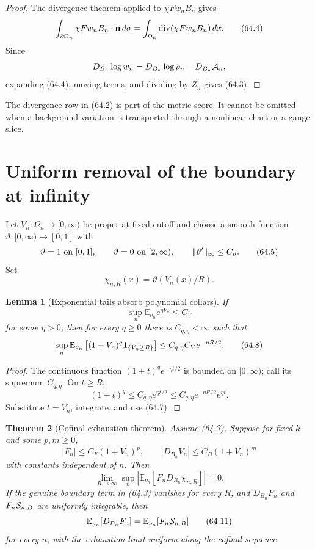 \documentclass[11pt]{article}
\newtheorem{theorem}{Theorem}[section]
\newtheorem{lemma}[theorem]{Lemma}
\theoremstyle{remark}
\begin{document}
\begin{proof}
The divergence theorem applied to
\(\chi Fw_nB_n\) gives
\[
 \int_{\partial\Omega_n}\chi Fw_nB_n\mathbin{\cdot}{\bf n}\,d\sigma
 =
 \int_{\Omega_n}\operatorname{div}(\chi Fw_nB_n)\,dx.  \tag{64.4}
\]
Since
\[
 D_{B_n}\log w_n
 =
 D_{B_n}\log\rho_n-D_{B_n}{\cal A}_n,
\]
expanding (64.4), moving terms, and dividing by \(Z_n\)
gives (64.3).
\end{proof}

The divergence row in (64.2) is part of the metric score.  It
cannot be omitted when a background variation is transported
through a nonlinear chart or a gauge slice.

\section{Uniform removal of the boundary at infinity}

Let \(V_n:\Omega_n\to[0,\infty)\) be proper at fixed cutoff and
choose a smooth function \(\vartheta:[0,\infty)\to[0,1]\) with
\[
 \vartheta=1\ \hbox{on }[0,1],\qquad
 \vartheta=0\ \hbox{on }[2,\infty),\qquad
 \|\vartheta'\|_\infty\leq C_\vartheta.                \tag{64.5}
\]
Set
\[
 \chi_{n,R}(x)=\vartheta(V_n(x)/R).                    \tag{64.6}
\]

\begin{lemma}[Exponential tails absorb polynomial collars]
\label{lem:v15v64-tail}
If
\[
 \sup_n\mathbb E_{\nu_n}e^{\eta V_n}\leq C_V           \tag{64.7}
\]
for some \(\eta>0\), then for every \(q\geq0\) there is
\(C_{q,\eta}<\infty\) such that
\[
 \sup_n\mathbb E_{\nu_n}
 \left[(1+V_n)^q{\bf1}_{\{V_n\geq R\}}\right]
 \leq C_{q,\eta}C_Ve^{-\eta R/2}.                     \tag{64.8}
\]
\end{lemma}

\begin{proof}
The continuous function
\((1+t)^qe^{-\eta t/2}\) is bounded on \([0,\infty)\);
call its supremum \(C_{q,\eta}\).  On \(t\geq R\),
\[
 (1+t)^q
 \leq C_{q,\eta}e^{\eta t/2}
 \leq C_{q,\eta}e^{-\eta R/2}e^{\eta t}.
\]
Substitute \(t=V_n\), integrate, and use (64.7).
\end{proof}

\begin{theorem}[Cofinal exhaustion theorem]
\label{thm:v15v64-exhaustion}
Assume (64.7).  Suppose for fixed \(k\) and some \(p,m\geq0\),
\[
 |F_n|\leq C_F(1+V_n)^p,\qquad
 |D_{B_n}V_n|\leq C_B(1+V_n)^m                       \tag{64.9}
\]
with constants independent of \(n\).  Then
\[
 \lim_{R\to\infty}\sup_n
 \left|\mathbb E_{\nu_n}
 [F_nD_{B_n}\chi_{n,R}]\right|=0.                     \tag{64.10}
\]
If the genuine boundary term in (64.3) vanishes for every \(R\),
and \(D_{B_n}F_n\) and \(F_n{\cal S}_{n,B}\) are uniformly
integrable, then
\[
 \mathbb E_{\nu_n}[D_{B_n}F_n]
 =
 \mathbb E_{\nu_n}[F_n{\cal S}_{n,B}]                 \tag{64.11}
\]
for every \(n\), with the exhaustion limit uniform along the
cofinal sequence.
\end{theorem}
\end{document}

